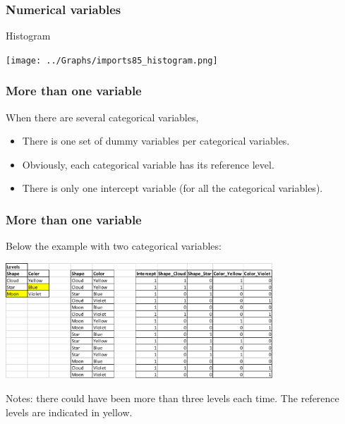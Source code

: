 \begin{frame}
\frametitle{Numerical variables}
Histogram
\begin{center}
\texttt{[image: ../Graphs/imports85\_histogram.png]}
\end{center}
\end{frame}
\begin{frame}
\frametitle{More than one variable}
When there are several categorical variables,
\begin{itemize}
\item There is one set of dummy variables per categorical variables.
\item Obviously, each categorical variable has its reference level.
\item There is only one intercept variable (for all the categorical variables).
\end{itemize}
\end{frame}
\begin{frame}
\frametitle{More than one variable}
Below the example with two categorical variables:
\begin{center}
\includegraphics[width=10cm]{../Graphs/Dummy_3.png}  
\end{center}
\scriptsize
Notes: there could have been more than three levels each time. The reference levels are indicated in yellow.
\normalsize
\end{frame}
